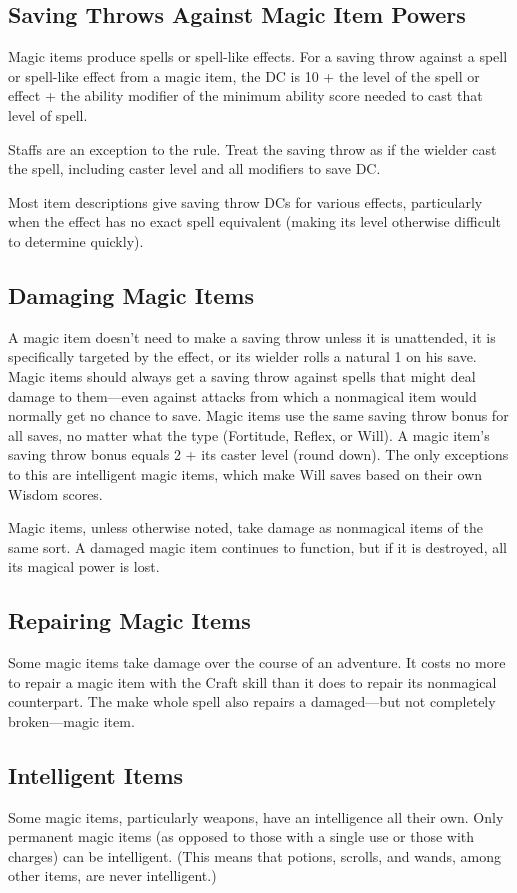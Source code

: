 \subsection{Saving Throws Against Magic Item Powers}
Magic items produce spells or spell-like effects. For a saving throw against a spell or spell-like effect from a magic item, the DC is 10 + the level of the spell or effect + the ability modifier of the minimum ability score needed to cast that level of spell.

Staffs are an exception to the rule. Treat the saving throw as if the wielder cast the spell, including caster level and all modifiers to save DC.

Most item descriptions give saving throw DCs for various effects, particularly when the effect has no exact spell equivalent (making its level otherwise difficult to determine quickly).

\subsection{Damaging Magic Items}
A magic item doesn't need to make a saving throw unless it is unattended, it is specifically targeted by the effect, or its wielder rolls a natural 1 on his save. Magic items should always get a saving throw against spells that might deal damage to them---even against attacks from which a nonmagical item would normally get no chance to save. Magic items use the same saving throw bonus for all saves, no matter what the type (Fortitude, Reflex, or Will). A magic item's saving throw bonus equals 2 + \onehalf its caster level (round down). The only exceptions to this are intelligent magic items, which make Will saves based on their own Wisdom scores.

Magic items, unless otherwise noted, take damage as nonmagical items of the same sort. A damaged magic item continues to function, but if it is destroyed, all its magical power is lost.

\subsection{Repairing Magic Items}
Some magic items take damage over the course of an adventure. It costs no more to repair a magic item with the Craft skill than it does to repair its nonmagical counterpart. The make whole spell also repairs a damaged---but not completely broken---magic item.

\subsection{Intelligent Items}
Some magic items, particularly weapons, have an intelligence all their own. Only permanent magic items (as opposed to those with a single use or those with charges) can be intelligent. (This means that potions, scrolls, and wands, among other items, are never intelligent.)

